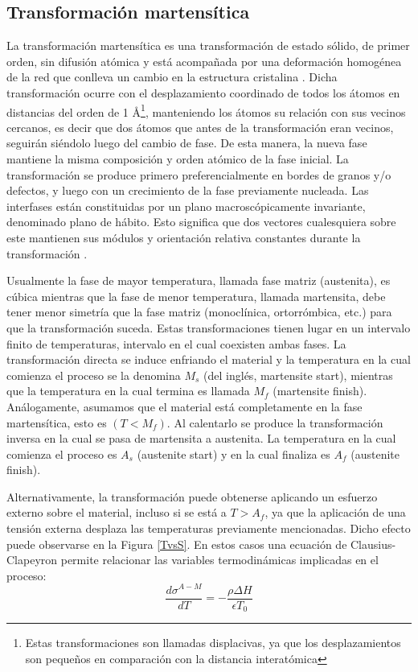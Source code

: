 \documentclass[12pt]{article}
\theoremstyle{definition}
\theoremstyle{remark}
\begin{document}
\subsection{Transformación martensítica}

La transformación martensítica es una transformación de estado sólido, de primer orden, sin difusión atómica y está acompañada por una deformación homogénea de la red que conlleva un cambio en la estructura cristalina \cite{Santamarta}. Dicha transformación ocurre con el desplazamiento coordinado de todos los átomos en distancias del orden de 1 \AA \footnote{Estas transformaciones son llamadas displacivas, ya que los desplazamientos son pequeños en comparación con la distancia interatómica}, manteniendo los átomos su relación con sus vecinos cercanos, es decir que dos átomos que antes de la transformación eran vecinos, seguirán siéndolo luego del cambio de fase\cite{HTSMA}. De esta manera, la nueva fase mantiene la misma composición y orden atómico de la fase inicial. La transformación se produce primero preferencialmente en bordes de granos y/o defectos, y luego con un crecimiento de la fase previamente nucleada. Las interfases están constituidas por un plano macroscópicamente invariante, denominado plano de hábito. Esto significa que dos vectores cualesquiera sobre este mantienen sus módulos y orientación relativa constantes durante la transformación \cite{Santamarta}.

Usualmente la fase de mayor temperatura, llamada fase matriz (austenita), es cúbica mientras que la fase de menor temperatura, llamada martensita, debe tener menor simetría que la fase matriz (monoclínica, ortorrómbica, etc.) para que la transformación suceda\cite{Malvasio}. Estas transformaciones tienen lugar en un intervalo finito de temperaturas, intervalo en el cual coexisten ambas fases. La transformación directa se induce enfriando el material y la temperatura en la cual comienza el proceso se la denomina $M_s$ (del inglés, martensite start), mientras que la temperatura en la cual termina es llamada $M_f$ (martensite finish). Análogamente, asumamos que el material está completamente en la fase martensítica, esto es $(T < M_f)$. Al calentarlo se produce la transformación inversa en la cual se pasa de martensita a austenita. La temperatura en la cual comienza el proceso es $A_s$ (austenite start) y en la cual finaliza es $A_f$ (austenite finish)\cite{Santamarta}.

Alternativamente, la transformación puede obtenerse aplicando un esfuerzo externo sobre el material, incluso si se está a $T > A_f$, ya que la aplicación de una tensión externa desplaza las temperaturas previamente mencionadas. Dicho efecto puede observarse en la Figura \ref{TvsS}. En estos casos una ecuación de Clausius-Clapeyron permite relacionar las variables termodinámicas implicadas en el proceso:
\begin{equation}
	\frac{d\sigma^{A-M}}{dT} = -\frac{\rho \Delta H}{\epsilon T_0}
\end{equation}
\end{document}
